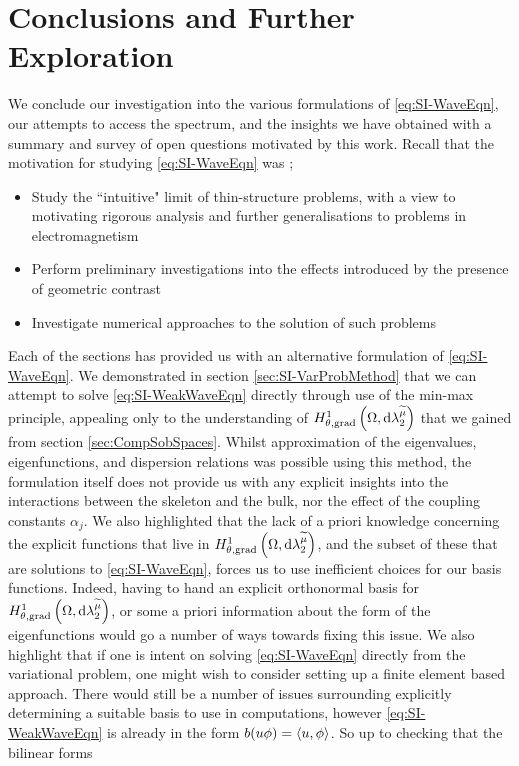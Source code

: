 \section{Conclusions and Further Exploration} \label{sec:SI-Conc}
We conclude our investigation into the various formulations of \eqref{eq:SI-WaveEqn}, our attempts to access the spectrum, and the insights we have obtained with a summary and survey of open questions motivated by this work.
Recall that the motivation for studying \eqref{eq:SI-WaveEqn} was ;
\begin{itemize}
	\item Study the ``intuitive" limit of thin-structure problems, with a view to motivating rigorous analysis and further generalisations to problems in electromagnetism
	\item Perform preliminary investigations into the effects introduced by the presence of geometric contrast
	\item Investigate numerical approaches to the solution of such problems
\end{itemize} 

Each of the sections  has provided us with an alternative formulation of \eqref{eq:SI-WaveEqn}.
We demonstrated in section \ref{sec:SI-VarProbMethod} that we can attempt to solve \eqref{eq:SI-WeakWaveEqn} directly through use of the min-max principle, appealing only to the understanding of $H^1_{\theta, \mathrm{grad}}\left( \Omega, \mathrm{d}\lambda_2^{\widetilde{\mu}} \right)$ that we gained from section \ref{sec:CompSobSpaces}.
Whilst approximation of the eigenvalues, eigenfunctions, and dispersion relations was possible using this method, the formulation itself does not provide us with any explicit insights into the interactions between the skeleton and the bulk, nor the effect of the coupling constants $\alpha_j$.
We also highlighted that the lack of a priori knowledge concerning the explicit functions that live in $H^1_{\theta, \mathrm{grad}}\left( \Omega, \mathrm{d}\lambda_2^{\widetilde{\mu}} \right)$, and the subset of these that are solutions to \eqref{eq:SI-WaveEqn}, forces us to use inefficient choices for our basis functions.
Indeed, having to hand an explicit orthonormal basis for $H^1_{\theta, \mathrm{grad}}\left( \Omega, \mathrm{d}\lambda_2^{\widetilde{\mu}} \right)$, or some a priori information about the form of the eigenfunctions would go a number of ways towards fixing this issue.
We also highlight that if one is intent on solving \eqref{eq:SI-WaveEqn} directly from the variational problem, one might wish to consider setting up a finite element based approach.
There would still be a number of issues surrounding explicitly determining a suitable basis to use in computations, however \eqref{eq:SI-WeakWaveEqn} is already in the form $b(u\phi)=\left\langle u , \phi \right\rangle$.
So up to checking that the bilinear forms 

